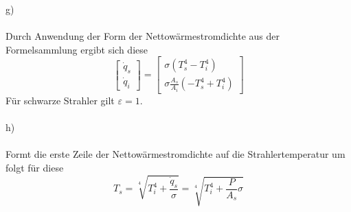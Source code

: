 g)\\ \\
Durch Anwendung der Form der Nettowärmestromdichte aus der Formelsammlung ergibt sich diese
\[
	\begin{bmatrix}
		\dot{q}_s \\
		\dot{q}_i
	\end{bmatrix}
	=
	\begin{bmatrix}
		\sigma(T_s^4 - T_i^4) \\
		\sigma\frac{A_s}{A_i}(-T_s^4 + T_i^4)
	\end{bmatrix}
\]
Für schwarze Strahler gilt $\varepsilon = 1$. \\ \\
h) \\ \\ 
Formt die erste Zeile der Nettowärmestromdichte auf die Strahlertemperatur um folgt für diese
\[
	T_s = \sqrt[4]{T_i^4 + \frac{\dot{q}_s}{\sigma}} = \sqrt[4]{T_i^4 + \frac{P}{A_s}\sigma}
\]